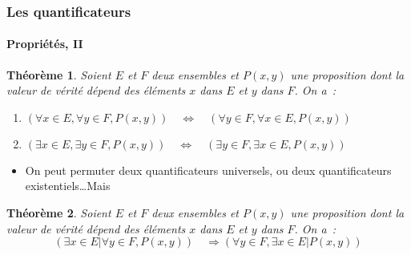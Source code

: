 \documentclass[10pt,notheorems]{beamer}
\theoremstyle{plain}
\newtheorem{theorem}{Théorème}
\theoremstyle{definition} %
\begin{document}
\begin{frame}
  \frametitle{Les quantificateurs}
  \framesubtitle{Propriétés, II}
  \hypertarget{slide_quantificateur_proprietes_2}{}

  \begin{theorem}\label{thm:quantificateurs_perm_1}
    Soient $E$ et $F$ deux ensembles et $P(x,y)$ une proposition dont la valeur de vérité dépend des éléments $x$ dans $E$ et $y$ dans $F$. On a~:
    \begin{enumerate}
    \item $(\forall x\in E, \forall y\in F, P(x,y)) \quad \Leftrightarrow \quad (\forall y\in F, \forall x\in E, P(x,y))$
    \item $(\exists x\in E, \exists y\in F, P(x,y)) \quad \Leftrightarrow \quad (\exists y\in F, \exists x\in E, P(x,y))$
    \end{enumerate}
  \end{theorem}

  \bigskip

  \begin{itemize}
  \item On peut permuter deux quantificateurs universels, ou deux quantificateurs existentiels\ldots Mais
  \end{itemize}

  \begin{theorem}\label{thm:quantificateurs_perm_2}
    Soient $E$ et $F$ deux ensembles et $P(x,y)$ une proposition dont la valeur de vérité dépend des éléments $x$ dans $E$ et $y$ dans $F$. On a~:
    \[
      (\exists x\in E | \forall y\in F, P(x,y)) \quad \Rightarrow (\forall y\in F, \exists x\in E| P(x,y))
    \]
  \end{theorem}

\end{frame}
\end{document}
